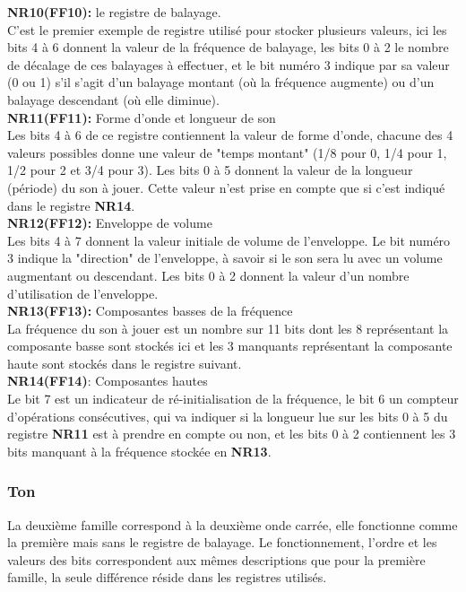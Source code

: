 \documentclass{report}
\begin{document}
		\textbf{NR10(FF10):} le registre de balayage.\\
		C'est le premier exemple de registre utilisé pour
		stocker plusieurs valeurs, ici les bits 4 à 6 donnent
		la valeur de la fréquence de balayage, les bits 0 à 2
		le nombre de décalage de ces balayages à effectuer, et le bit
		numéro 3 indique par sa valeur (0 ou 1) s'il s'agit
		d'un balayage montant (où la fréquence augmente) ou
		d'un balayage descendant (où elle diminue).\\ 
	
	\textbf{NR11(FF11):} Forme d'onde et longueur de son\\
		Les bits 4 à 6 de ce registre contiennent la valeur de
		forme d'onde, chacune des 4 valeurs possibles donne
		une valeur de "temps montant" (1/8 pour 0, 1/4 pour
		1, 1/2 pour 2 et 3/4 pour 3).
		Les bits 0 à 5 donnent la valeur de la longueur
		(période) du son à jouer. Cette valeur n'est prise en
		compte que si c'est indiqué dans le registre \textbf{NR14}.\\
	
	\textbf{NR12(FF12):} Enveloppe de volume \\
		Les bits 4 à 7 donnent la valeur initiale de volume de
		l'enveloppe.
		Le bit numéro 3 indique la "direction" de l'enveloppe,
		à savoir si le son sera lu avec un volume augmentant
		ou descendant.
		Les bits 0 à 2 donnent la valeur d'un nombre
		d'utilisation de l'enveloppe.\\ 
	
	\textbf{NR13(FF13):} Composantes basses de la fréquence \\
		La fréquence du son à jouer est un nombre sur 11 bits
		dont les 8 représentant la composante basse sont
		stockés ici et les 3 manquants représentant la
		composante haute sont stockés dans le registre
		suivant.\\ 

		\textbf{NR14(FF14)}: Composantes hautes \\
		Le bit 7 est un indicateur de ré-initialisation de la
		fréquence, le bit 6 un compteur d'opérations
		consécutives, qui va indiquer si la longueur lue sur
		les bits 0 à 5 du registre \textbf{NR11} est à prendre en
		compte ou non, et les bits 0 à 2 contiennent les 3 bits
		manquant à la fréquence stockée en \textbf{NR13}.
		\subsubsection{Ton}
		La deuxième famille correspond à la deuxième onde carrée, elle
		fonctionne comme la première mais sans le registre de
		balayage. Le fonctionnement, l'ordre et les valeurs des bits
		correspondent aux mêmes descriptions que pour la première
		famille, la seule différence réside dans les registres
		utilisés.\\ \\
	
\end{document}
